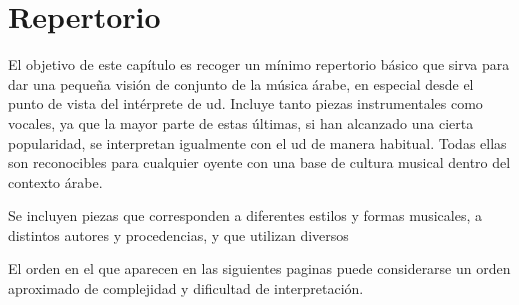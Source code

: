\chapter{Repertorio}
\label{repertorio}

\pagestyle{fancyplain}

El objetivo de este capítulo es recoger un mínimo repertorio básico que sirva para dar una pequeña visión de conjunto de la música árabe, en especial desde el punto de vista del intérprete de ud. Incluye tanto piezas instrumentales como vocales, ya que la mayor parte de estas últimas, si han alcanzado una cierta popularidad, se interpretan igualmente con el ud de manera habitual. Todas ellas son reconocibles para cualquier oyente con una base de cultura musical dentro del contexto árabe.

Se incluyen piezas que corresponden a diferentes estilos y formas musicales, a distintos autores y procedencias, y que utilizan diversos \maqamaat

El orden en el que aparecen en las siguientes paginas puede considerarse un orden aproximado de complejidad y dificultad de interpretación.


















%









\pagestyle{empty}